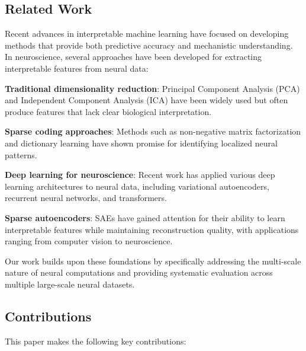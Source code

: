 \subsection{Related Work}

Recent advances in interpretable machine learning have focused on developing methods that provide both predictive accuracy and mechanistic understanding. In neuroscience, several approaches have been developed for extracting interpretable features from neural data:

\textbf{Traditional dimensionality reduction}: Principal Component Analysis (PCA) and Independent Component Analysis (ICA) have been widely used but often produce features that lack clear biological interpretation.

\textbf{Sparse coding approaches}: Methods such as non-negative matrix factorization and dictionary learning have shown promise for identifying localized neural patterns.

\textbf{Deep learning for neuroscience}: Recent work has applied various deep learning architectures to neural data, including variational autoencoders, recurrent neural networks, and transformers.

\textbf{Sparse autoencoders}: SAEs have gained attention for their ability to learn interpretable features while maintaining reconstruction quality, with applications ranging from computer vision to neuroscience.

Our work builds upon these foundations by specifically addressing the multi-scale nature of neural computations and providing systematic evaluation across multiple large-scale neural datasets.

\subsection{Contributions}

This paper makes the following key contributions:

